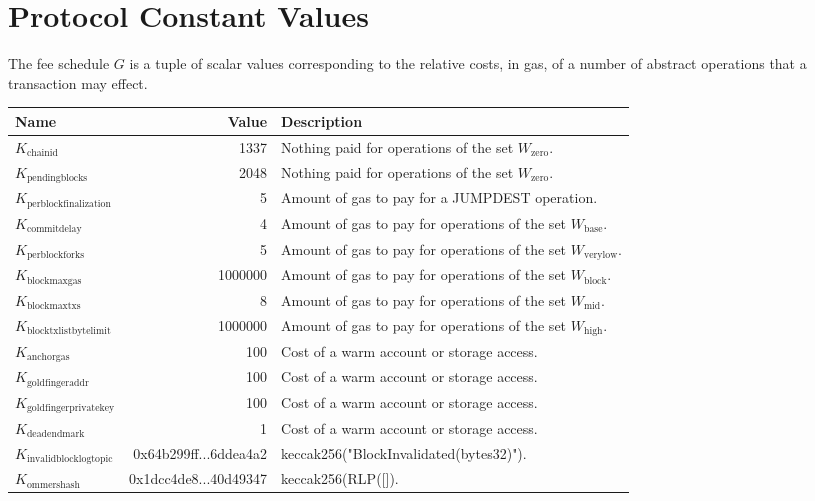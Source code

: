 \documentclass[9pt,oneside]{amsart}
\begin{document}
\section{Protocol Constant Values}\label{app:fees}

\nopagebreak
The fee schedule $G$ is a tuple of scalar values corresponding to the relative costs, in gas, of a number of abstract operations that a transaction may effect.

\nopagebreak
\begin{tabu}{l r l}
\toprule
Name & Value & Description \\
\midrule
$K_{\mathrm{chainid}}$ & 1337 & Nothing paid for operations of the set {\small $W_{\mathrm{zero}}$}. \\
$K_{\mathrm{pendingblocks}}$ & 2048 & Nothing paid for operations of the set {\small $W_{\mathrm{zero}}$}. \\
$K_{\mathrm{perblockfinalization}}$ & 5 & Amount of gas to pay for a {\small JUMPDEST} operation. \\
$K_{\mathrm{commitdelay}}$ & 4 & Amount of gas to pay for operations of the set {\small $W_{\mathrm{base}}$}. \\
$K_{\mathrm{perblockforks}}$ & 5 & Amount of gas to pay for operations of the set {\small $W_{\mathrm{verylow}}$}. \\
$K_{\mathrm{blockmaxgas}}$ & 1000000 & Amount of gas to pay for operations of the set {\small $W_{\mathrm{block}}$}. \\
$K_{\mathrm{blockmaxtxs}}$ & 8 & Amount of gas to pay for operations of the set {\small $W_{\mathrm{mid}}$}. \\
$K_{\mathrm{blocktxlistbytelimit}}$ & 1000000 & Amount of gas to pay for operations of the set {\small $W_{\mathrm{high}}$}. \\
$K_{\mathrm{anchorgas}}$ & 100 & Cost of a warm account or storage access. \\
$K_{\mathrm{goldfingeraddr}}$ & 100 & Cost of a warm account or storage access. \\
$K_{\mathrm{goldfingerprivatekey}}$ & 100 & Cost of a warm account or storage access. \\
$K_{\mathrm{deadendmark}}$ & 1 & Cost of a warm account or storage access. \\
$K_{\mathrm{invalidblocklogtopic}}$ & 0x64b299ff...6ddea4a2 & keccak256("BlockInvalidated(bytes32)"). \\
$K_{\mathrm{ommershash}}$ & 0x1dcc4de8...40d49347 & keccak256(RLP([]). \\
\bottomrule
\end{tabu}
\end{document}
